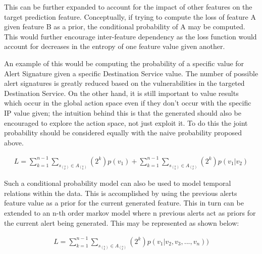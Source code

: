 This can be further expanded to account for the impact of other features on the target prediction feature. Conceptually, if trying to compute the loss of feature A given feature B as a prior, the conditional probability of A may be computed. This would further encourage inter-feature dependency as the loss function would account for decreases in the entropy of one feature value given another.

An example of this would be computing the probability of a specific value for Alert Signature given a specific Destination Service value. The number of possible alert signatures is greatly reduced based on the vulnerabilities in the targeted Destination Service. On the other hand, it is still important to value results which occur in the global action space even if they don't occur with the specific IP value given; the intuition behind this is that the generated should also be encouraged to explore the action space, not just exploit it. To do this the joint probability should be considered equally with the naive probability proposed above. 

\begin{gather}
L = \sum_{k=1}^{n-1}\sum_{s_{{(^n_k)}} \in A_{(^n_k)}} (2^k)p(v_1) + \sum_{k=1}^{n-1}\sum_{s_{{(^n_k)}} \in A_{(^n_k)}} (2^k)p(v_1|v_2)
\end{gather}

Such a conditional probability model can also be used to model temporal relations within the data. This is accomplished by using the previous alerts feature value as a prior for the current generated feature. This in turn can be extended to an n-th order markov model where n previous alerts act as priors for the current alert being generated. This may be represented as shown below:

\begin{gather}
L =  \sum_{k=1}^{n-1}\sum_{s_{{(^n_k)}} \in A_{(^n_k)}} (2^k)p(v_1|v_2, v_3, ..., v_n))
\end{gather}

